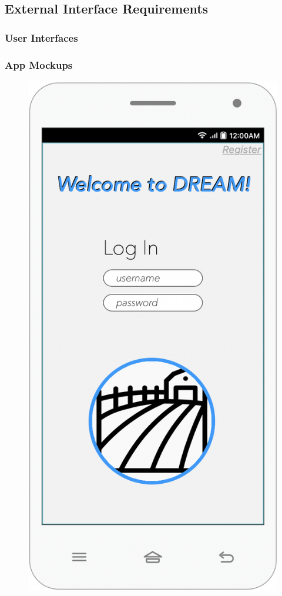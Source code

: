 \subsection{External Interface Requirements}

\subsubsection{User Interfaces}
\subsubsection{App Mockups}

 
\begin{multicols}{3}
\begin{figure}[H]

 \centering
\includegraphics[scale=0.35]{../images_diagrams/mock_ups/login100.png}

\end{figure}
\end{multicols}
